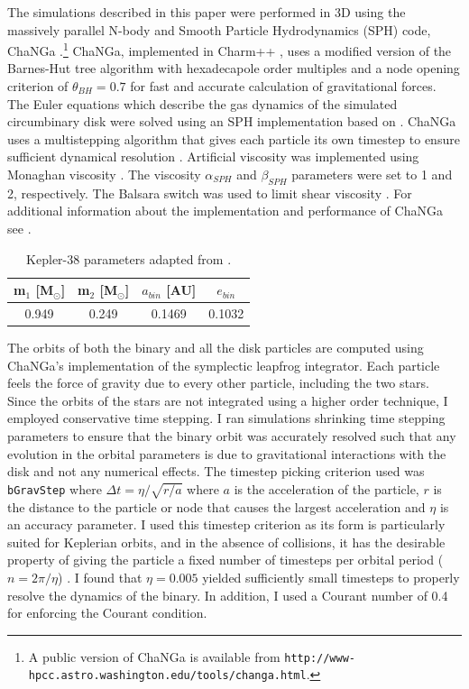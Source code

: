 The simulations described in this paper were performed in 3D using the massively parallel N-body 
and Smooth Particle Hydrodynamics (SPH) code, ChaNGa
\citep{Menon2015}.\footnote{A public version of ChaNGa is available
  from {\tt http://www-hpcc.astro.washington.edu/tools/changa.html}.}
ChaNGa, implemented in Charm++ \citep{Kale1996}, uses a modified version of the Barnes-Hut tree algorithm with hexadecapole 
order multiples and a node opening criterion of $\theta_{BH} =
  0.7$ for fast and accurate calculation of gravitational forces.  The Euler equations which describe
the gas dynamics of the simulated circumbinary disk were solved using an SPH implementation based on
\citet{Wadsley2004}.  ChaNGa uses a multistepping algorithm that gives
each particle its own timestep to ensure sufficient dynamical
resolution \citep{Quinn1997}.  Artificial viscosity was implemented using
Monaghan viscosity \citep{Monaghan1983}.  The viscosity $\alpha_{SPH}$
  and $\beta_{SPH}$ parameters were set to 1 and 2, respectively.  The Balsara switch was used to limit shear viscosity \citep{Balsara1995}.  For additional information about the implementation and performance of ChaNGa see \citet{Jetley2008}.

\begin{table}
	\centering
	\caption{Kepler-38 parameters adapted from \citet{Orosz2012}.}
	\begin{tabular}{cccc} %
		\hline
		m$_1$ [M$_{\odot}$] & m$_2$ [M$_{\odot}$] & $a_{bin}$ [AU] & $e_{bin}$\\
		\hline
		0.949 & 0.249 & 0.1469 & 0.1032\\
		\hline
	\end{tabular}
	\label{tab:CBDisk_table_1}
\end{table}

The orbits of both the binary and all the disk particles are computed using ChaNGa's implementation of the 
symplectic leapfrog integrator.  Each particle feels the force of gravity due to every other particle, including
the two stars.  Since the orbits of the stars are not integrated using a higher order technique, I employed conservative
time stepping.  I ran simulations shrinking time stepping parameters to 
ensure that the binary orbit was accurately resolved such that any evolution in the orbital parameters is due to 
gravitational interactions with the disk and not any numerical
effects.  The timestep picking criterion used was {\tt bGravStep} where  
$\Delta t = \eta/\sqrt{r/a}$ where $a$ is the acceleration of the
particle, $r$ is the distance to the particle or node that causes the largest
acceleration and $\eta$ is an accuracy parameter.  I used this timestep criterion as its form is particularly suited for Keplerian orbits, and in the absence of collisions, it has the desirable property of giving the particle a fixed number of timesteps per orbital period ($n = 2\pi/ \eta$) \citep{Richardson2000}.  I found that 
$\eta = 0.005$ yielded sufficiently small timesteps to properly
resolve the dynamics of the binary.  In addition, I used a Courant number of
0.4 for enforcing the Courant condition.

